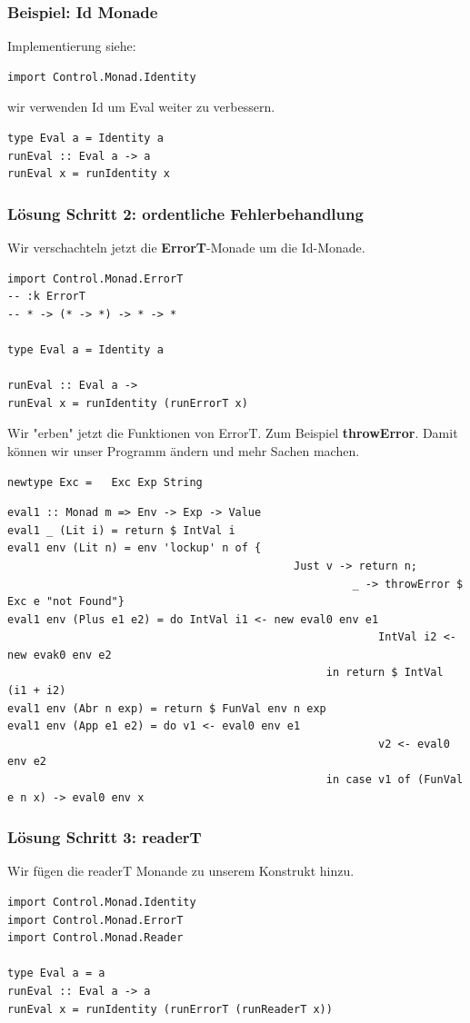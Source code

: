\documentclass[ngerman,a4paper]{report}
\begin{document}
\subsubsection{Beispiel: Id Monade}
Implementierung siehe:
\begin{lstlisting}
import Control.Monad.Identity
\end{lstlisting}
wir verwenden Id um Eval weiter zu verbessern.
\begin{lstlisting}
type Eval a = Identity a
runEval :: Eval a -> a
runEval x = runIdentity x
\end{lstlisting}



\subsubsection{Lösung Schritt 2: ordentliche Fehlerbehandlung}
Wir verschachteln jetzt die \textbf{ErrorT}-Monade um die Id-Monade.
\begin{lstlisting}
import Control.Monad.ErrorT
-- :k ErrorT
-- * -> (* -> *) -> * -> *

type Eval a = Identity a

runEval :: Eval a ->
runEval x = runIdentity (runErrorT x)
\end{lstlisting}
Wir "erben" jetzt die Funktionen von ErrorT. Zum Beispiel \textbf{throwError}. Damit können wir unser Programm ändern und mehr Sachen machen.
\begin{lstlisting}
newtype Exc = 	Exc Exp String
\end{lstlisting}

\begin{lstlisting}
eval1 :: Monad m => Env -> Exp -> Value
eval1 _ (Lit i) = return $ IntVal i
eval1 env (Lit n) = env 'lockup' n of {
											Just v -> return n; 
													 _ -> throwError $ Exc e "not Found"}
eval1 env (Plus e1 e2) = do IntVal i1 <- new eval0 env e1
														 IntVal i2 <- new evak0 env e2
												 in return $ IntVal (i1 + i2)
eval1 env (Abr n exp) = return $ FunVal env n exp
eval1 env (App e1 e2) = do v1 <- eval0 env e1
														 v2 <- eval0 env e2
												 in case v1 of (FunVal e n x) -> eval0 env x				
\end{lstlisting}
\subsubsection{Lösung Schritt 3: readerT}
Wir fügen die readerT Monande zu unserem Konstrukt hinzu.\\
\begin{lstlisting}
import Control.Monad.Identity
import Control.Monad.ErrorT
import Control.Monad.Reader

type Eval a = a
runEval :: Eval a -> a
runEval x = runIdentity (runErrorT (runReaderT x))
\end{lstlisting}
\end{document}
